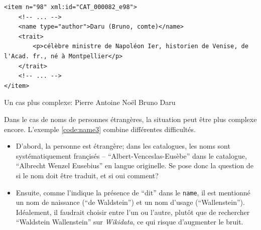 \documentclass[a4paper, 12pt, twoside]{book}
\newenvironment{code}{\captionsetup{type=listing}}{}
\newcommand{\tname}{\texttt{name}}
\newcommand{\wkd}{\textit{Wikidata}}
\begin{document}
\begin{code}
	\begin{verbatim}
<item n="98" xml:id="CAT_000082_e98">
	<!-- ... -->
	<name type="author">Daru (Bruno, comte)</name>
	<trait>
		<p>célèbre ministre de Napoléon Ier, historien de Venise, de l'Acad. fr., né à Montpellier</p>
	</trait>
	<!-- ... -->
</item>
	\end{verbatim}
	\caption{Un cas plus complexe: Pierre Antoine Noël Bruno Daru}
	\label{code:name2}
\end{code}

Dans le cas de noms de personnes étrangères, la situation peut être plus complexe encore. L'exemple \ref{code:name3} combine différentes difficultés.
\begin{itemize}
	\item D'abord, la personne est étrangère; dans les catalogues, les noms sont systématiquement françisés -- \enquote{Albert-Venceslas-Eusèbe} dans le catalogue, \enquote{Albrecht Wenzel Eusebius} en langue originelle. Se pose donc la question de si le nom doit être traduit, et si oui comment? 
	\item Ensuite, comme l'indique la présence de \enquote{dit} dans le \tname{}, il est mentionné un nom de naissance (\enquote{de Waldstein}) et un nom d'usage (\enquote{Wallenstein}). Idéalement, il faudrait choisir entre l'un ou l'autre, plutôt que de rechercher \enquote{Waldstein Wallenstein} sur \wkd{}, ce qui risque d'augmenter le bruit. 
\end{itemize}
\end{document}

